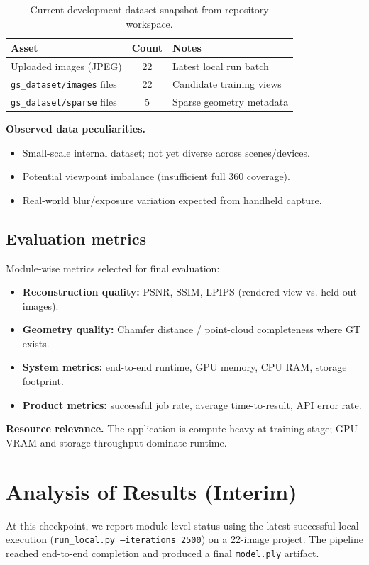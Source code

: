 \documentclass[10pt,twocolumn,letterpaper]{article}
\begin{document}
\begin{table}[t]
\centering
\caption{Current development dataset snapshot from repository workspace.}
\label{tab:eda}
\begin{tabularx}{\columnwidth}{@{}l c Y@{}}
\toprule
Asset & Count & Notes \\
\midrule
Uploaded images (JPEG) & 22 & Latest local run batch \\
\texttt{gs\_dataset/images} files & 22 & Candidate training views \\
\texttt{gs\_dataset/sparse} files & 5 & Sparse geometry metadata \\
\bottomrule
\end{tabularx}
\end{table}

\textbf{Observed data peculiarities.}
\begin{itemize}[leftmargin=*]
    \item Small-scale internal dataset; not yet diverse across scenes/devices.
    \item Potential viewpoint imbalance (insufficient full 360 coverage).
    \item Real-world blur/exposure variation expected from handheld capture.
\end{itemize}

\subsection{Evaluation metrics}
Module-wise metrics selected for final evaluation:
\begin{itemize}[leftmargin=*]
    \item \textbf{Reconstruction quality:} PSNR, SSIM, LPIPS (rendered view vs. held-out images).
    \item \textbf{Geometry quality:} Chamfer distance / point-cloud completeness where GT exists.
    \item \textbf{System metrics:} end-to-end runtime, GPU memory, CPU RAM, storage footprint.
    \item \textbf{Product metrics:} successful job rate, average time-to-result, API error rate.
\end{itemize}

\textbf{Resource relevance.} The application is compute-heavy at training stage; GPU VRAM and storage throughput dominate runtime.

\section{Analysis of Results (Interim)}
At this checkpoint, we report module-level status using the latest successful local execution (\texttt{run\_local.py --iterations 2500}) on a 22-image project. The pipeline reached end-to-end completion and produced a final \texttt{model.ply} artifact.
\end{document}
